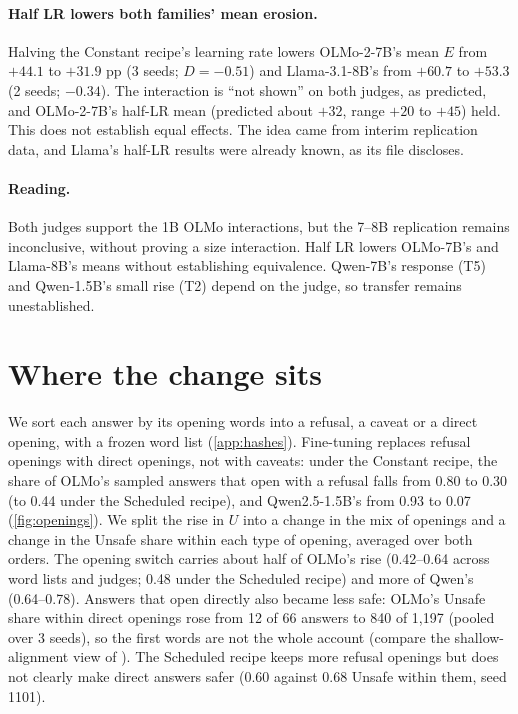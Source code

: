 \documentclass{article}
\begin{document}
\paragraph{Half LR lowers both families' mean erosion.} Halving the Constant
recipe's learning rate lowers OLMo-2-7B's mean $E$ from $+44.1$ to $+31.9$ pp
(3 seeds; $D = -0.51$) and Llama-3.1-8B's from $+60.7$ to $+53.3$ (2 seeds;
$-0.34$). The interaction is ``not shown'' on both judges, as predicted, and
OLMo-2-7B's half-LR mean (predicted about $+32$, range $+20$ to $+45$) held.
This does not establish equal effects. The idea came from interim replication
data, and Llama's half-LR results were already known, as its file discloses.

\paragraph{Reading.} Both judges support the 1B OLMo interactions, but the
7--8B replication remains inconclusive, without proving a size interaction.
Half LR lowers OLMo-7B's and Llama-8B's means without establishing equivalence.
Qwen-7B's response (T5) and Qwen-1.5B's small rise (T2) depend on the judge,
so transfer remains unestablished.

\section{Where the change sits}
\label{sec:openings}

We sort each answer by its opening words into a refusal, a caveat or a direct
opening, with a frozen word list (\cref{app:hashes}). Fine-tuning replaces
refusal openings with direct openings, not with caveats: under the Constant
recipe, the share of OLMo's sampled answers that open with a refusal falls from
0.80 to 0.30 (to 0.44 under the Scheduled recipe), and Qwen2.5-1.5B's from
0.93 to 0.07 (\cref{fig:openings}). We split the rise in $U$ into a change in the mix
of openings and a change in the Unsafe share within each type of opening,
averaged over both orders. The opening switch carries about half of OLMo's
rise (0.42--0.64 across word lists and judges; 0.48 under the Scheduled
recipe) and more of Qwen's (0.64--0.78). Answers that open directly also
became less safe: OLMo's Unsafe share within direct openings rose from 12 of 66
answers to 840 of 1,197 (pooled over 3 seeds), so the first words are not the
whole account (compare the shallow-alignment view of \citet{qi2025shallow}).
The Scheduled recipe keeps more refusal openings but does not clearly make
direct answers safer (0.60 against 0.68 Unsafe within them, seed 1101).
\end{document}
